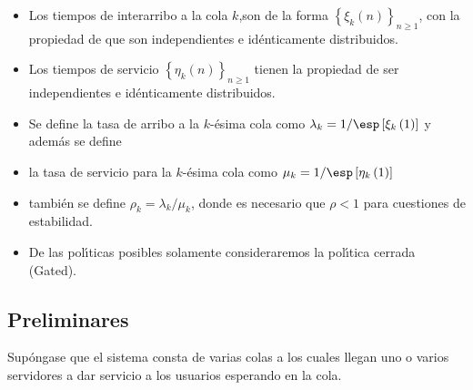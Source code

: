 \begin{itemize}
\item Los tiempos de interarribo a la cola $k$,son de la forma
$\left\{\xi_{k}\left(n\right)\right\}_{n\geq1}$, con la propiedad
de que son independientes e id{\'e}nticamente distribuidos.

\item Los tiempos de servicio
$\left\{\eta_{k}\left(n\right)\right\}_{n\geq1}$ tienen la
propiedad de ser independientes e id{\'e}nticamente distribuidos.

\item Se define la tasa de arribo a la $k$-{\'e}sima cola como
$\lambda_{k}=1/\esp\left[\xi_{k}\left(1\right)\right]$ y
adem{\'a}s se define

\item la tasa de servicio para la $k$-{\'e}sima cola como
$\mu_{k}=1/\esp\left[\eta_{k}\left(1\right)\right]$

\item tambi{\'e}n se define $\rho_{k}=\lambda_{k}/\mu_{k}$, donde
es necesario que $\rho<1$ para cuestiones de estabilidad.

\item De las pol{\'\i}ticas posibles solamente consideraremos la
pol{\'\i}tica cerrada (Gated).
\end{itemize}




\subsection{Preliminares}



Sup\'ongase que el sistema consta de varias colas a los cuales
llegan uno o varios servidores a dar servicio a los usuarios
esperando en la cola.\\


